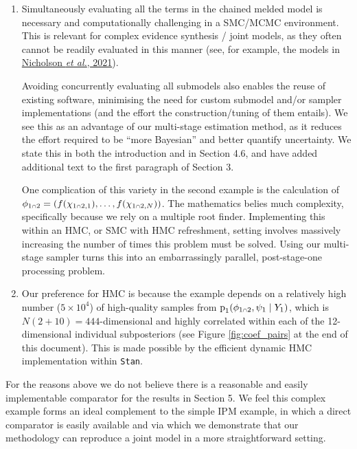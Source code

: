 \documentclass[
  10pt,
  a4paper,
]{article}
\let\Oldcap\cap
\renewcommand{\cap}{\mathrel{\mathsmaller{\Oldcap}}}
\newcommand{\pd}{\text{p}}
\begin{document}
\begin{enumerate}
\def\labelenumi{\arabic{enumi}.}
\item
  Simultaneously evaluating all the terms in the chained melded model is
  necessary and computationally challenging in a SMC/MCMC environment.
  This is relevant for complex evidence synthesis / joint models, as
  they often cannot be readily evaluated in this manner (see, for
  example, the models in
  \protect\hyperlink{ref-nicholson_interoperability_2021}{Nicholson
  \emph{et al.}, 2021}).

  Avoiding concurrently evaluating all submodels also enables the reuse
  of existing software, minimising the need for custom submodel and/or
  sampler implementations (and the effort the construction/tuning of
  them entails). We see this as an advantage of our multi-stage
  estimation method, as it reduces the effort required to be ``more
  Bayesian'' and better quantify uncertainty. We state this in both the
  introduction and in Section 4.6, and have added additional text to the
  first paragraph of Section 3.

  One complication of this variety in the second example is the
  calculation of
  \(\phi_{1 \cap 2} = (f(\chi_{1 \cap 2, 1}), \ldots, f(\chi_{1 \cap 2, N}))\).
  The mathematics belies much complexity, specifically because we rely
  on a multiple root finder. Implementing this within an HMC, or SMC
  with HMC refreshment, setting involves massively increasing the number
  of times this problem must be solved. Using our multi-stage sampler
  turns this into an embarrassingly parallel, post-stage-one processing
  problem.
\item
  Our preference for HMC is because the example depends on a relatively
  high number (\(5 \times 10^{4}\)) of high-quality samples from
  \(\pd_{1}(\phi_{1 \cap 2}, \psi_{1} \mid Y_{1})\), which is
  \(N(2 + 10) = 444\)-dimensional and highly correlated within each of
  the 12-dimensional individual subposteriors (see Figure
  \ref{fig:coef_pairs} at the end of this document). This is made
  possible by the efficient dynamic HMC implementation within
  \texttt{Stan}.
\end{enumerate}

For the reasons above we do not believe there is a reasonable and easily
implementable comparator for the results in Section 5. We feel this
complex example forms an ideal complement to the simple IPM example, in
which a direct comparator is easily available and via which we
demonstrate that our methodology can reproduce a joint model in a more
straightforward setting.
\end{document}
